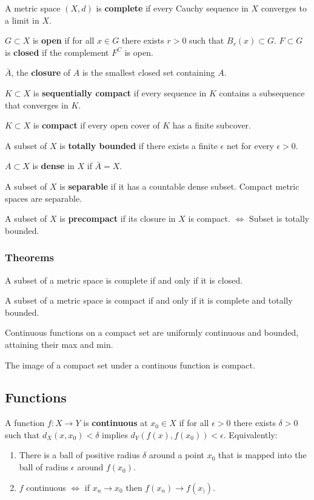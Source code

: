 \documentclass[12pt]{article}
\begin{document}
A metric space $(X, d)$ is \textbf{complete} if every Cauchy sequence in $X$
converges to a limit in $X$.

$G \subset X$ is \textbf{open} if for all $x \in G$ there exists $r > 0$
such that $B_r (x) \subset G$. $F \subset G$ is \textbf{closed} if the complement
$F^C$ is open.

$\bar{A}$, the \textbf{closure} of $A$ is the smallest closed set
containing $A$.

$K \subset X$ is \textbf{sequentially compact} if every sequence in $K$
contains a subsequence that converges in $K$.

$K \subset X$ is \textbf{compact} if every open cover of $K$ has a finite
subcover.

A subset of $X$ is \textbf{totally bounded} if there exists a finite
$\epsilon$ net for every $\epsilon > 0$.

$A \subset X$ is \textbf{dense} in $X$ if $\bar{A} = X$.

A subset of $X$ is \textbf{separable} if it has a countable dense subset.
Compact metric spaces are separable.

A subset of $X$ is \textbf{precompact} if its closure in $X$ is compact. 
$\iff$ Subset is totally bounded.


\subsubsection{Theorems}

A subset of a metric space is complete if and only if it is closed.

A subset of a metric space is compact if and only if it is complete and
totally bounded.

Continuous functions on a compact set are uniformly continuous and bounded,
attaining their max and min.

The image of a compact set under a continous function is compact.

\subsection{Functions}

A function $f : X \rightarrow Y$ is \textbf{continuous} at $x_0 \in X$ if
for all $\epsilon > 0$ there exists $\delta > 0$ such that $d_X(x, x_0) <
\delta$ implies $d_Y(f(x), f(x_0)) < \epsilon$. Equivalently:
\begin{enumerate}
    \item There is a ball of positive radius $\delta$
    around a point $x_0$ that is mapped into the ball of radius $\epsilon$ around
    $f(x_0)$.
    \item $f$ continuous $\iff$ if $x_n \rightarrow x_0$ then $f(x_n)
\rightarrow f(x_))$.
\end{enumerate}
\end{document}
